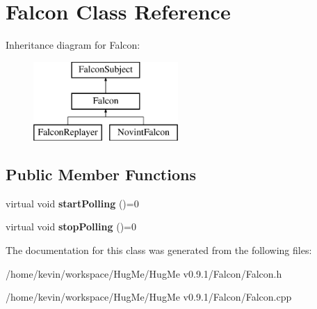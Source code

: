 \hypertarget{classFalcon}{
\section{Falcon Class Reference}
\label{classFalcon}
}
Inheritance diagram for Falcon:\begin{figure}[H]
\begin{center}
\leavevmode
\includegraphics[height=3cm]{classFalcon}
\end{center}
\end{figure}
\subsection*{Public Member Functions}
\begin{DoxyCompactItemize}
\item 
\hypertarget{classFalcon_a4de207fe80e98bf959ed7a41dca6012d}{
virtual void {\bfseries startPolling} ()=0}
\label{classFalcon_a4de207fe80e98bf959ed7a41dca6012d}

\item 
\hypertarget{classFalcon_ade1bdf4fb8825aa69927418045227e72}{
virtual void {\bfseries stopPolling} ()=0}
\label{classFalcon_ade1bdf4fb8825aa69927418045227e72}

\end{DoxyCompactItemize}


The documentation for this class was generated from the following files:\begin{DoxyCompactItemize}
\item 
/home/kevin/workspace/HugMe/HugMe v0.9.1/Falcon/Falcon.h\item 
/home/kevin/workspace/HugMe/HugMe v0.9.1/Falcon/Falcon.cpp\end{DoxyCompactItemize}
